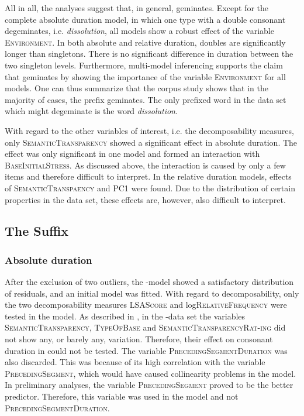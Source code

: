 All in all, the analyses suggest that, in general,  geminates. Except for the complete absolute duration model, in which one type with a double consonant degeminates, i.e. \textit{dissolution}, all  models show a robust effect of the variable \textsc{Environment}. In both absolute and relative duration, doubles are significantly longer than singletons. There is no significant difference in duration between the two singleton levels. Furthermore, multi-model inferencing supports the claim that  geminates by showing the importance of the variable \textsc{Environment} for all models. 
One can thus summarize that the corpus study shows that in the majority of cases, the prefix  geminates. The only prefixed word in the data set which might degeminate is the word \textit{dissolution}.

With regard to the other variables of interest, i.e. the decomposability measures, only \textsc{SemanticTransparency} showed a significant effect in absolute duration. The effect was only significant in one model and formed an interaction with \textsc{BaseInitialStress}. As discussed above, the interaction is  caused by only a few items and therefore difficult to interpret.
 In the relative duration models, effects of \textsc{SemanticTranspaency} and \textsc{PC1} were found. Due to the distribution of certain properties in the data set, these effects are, however, also difficult to interpret. 


\subsection{The Suffix }


\subsubsection{Absolute duration}

After the exclusion of two outliers, the -model showed a satisfactory distribution of residuals, and an initial model was fitted. 
With regard to decomposability, only the two decomposability measures \textsc{LSAScore} and log\textsc{RelativeFrequency} were tested in the model. As described in , in the -data set the variables \textsc{SemanticTransparency}, \textsc{TypeOfBase}  and \textsc{SemanticTransparencyRat-ing} did not show any, or barely any, variation. Therefore, their effect on consonant duration in  could not be tested. The variable \textsc{PrecedingSegmentDuration} was also discarded. This was because of its high correlation with the variable \textsc{PrecedingSegment}, which would have caused collinearity problems in the model. In preliminary analyses, the variable \textsc{PrecedingSegment} proved to be the better predictor. Therefore, this variable was used in the model and not \textsc{PrecedingSegmentDuration}. 

